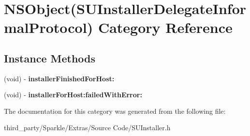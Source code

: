 \hypertarget{category_n_s_object_07_s_u_installer_delegate_informal_protocol_08}{}\section{N\+S\+Object(S\+U\+Installer\+Delegate\+Informal\+Protocol) Category Reference}
\label{category_n_s_object_07_s_u_installer_delegate_informal_protocol_08}
\subsection*{Instance Methods}
\begin{DoxyCompactItemize}
\item 
\mbox{\label{category_n_s_object_07_s_u_installer_delegate_informal_protocol_08_a2651403e9c3d2dd52927e91ebd2994c3}} 
(void) -\/ {\bfseries installer\+Finished\+For\+Host\+:}
\item 
\mbox{\label{category_n_s_object_07_s_u_installer_delegate_informal_protocol_08_abb582f1591931dd3bab014ba34871d5d}} 
(void) -\/ {\bfseries installer\+For\+Host\+:failed\+With\+Error\+:}
\end{DoxyCompactItemize}


The documentation for this category was generated from the following file\+:\begin{DoxyCompactItemize}
\item 
third\+\_\+party/\+Sparkle/\+Extras/\+Source Code/S\+U\+Installer.\+h\end{DoxyCompactItemize}
